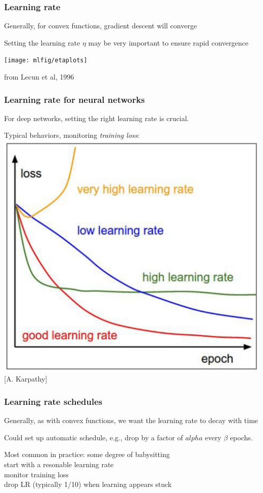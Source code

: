 \documentclass[xcolor=dvipsnames]{beamer}
\begin{document}
\begin{frame}
  \frametitle{Learning rate}
  \bi
\item Generally, for convex functions, gradient descent will converge
\item Setting the learning rate $\eta$ may be very important to ensure
  rapid convergence
  \begin{minipage}[c]{.6\linewidth}
\texttt{[image: mlfig/etaplots]}
  \end{minipage}%
  \begin{minipage}[c]{.4\linewidth}
from Lecun et al, 1996        
  \end{minipage}

\ei
\end{frame}


\begin{frame}
  \frametitle{Learning rate for neural networks}
  \bi
\item For deep networks, setting the right learning rate is crucial.
\item Typical behaviors, monitoring \emph{training loss}:
\includegraphics[width=.5\textwidth]{lrates-karpathy}[A. Karpathy]
\ei
\end{frame}

\begin{frame}
  \frametitle{Learning rate schedules}
  \bi
\item Generally, as with convex functions, we want the learning rate
  to decay with time
\item Could set up automatic schedule, e.g., drop by a factor of
  $alpha$ every $\beta$ epochs.
\item Most common in practice: some degree of babysitting\\
start with a resonable learning rate\\
monitor training loss\\
drop LR (typically 1/10) when learning appears stuck
\ei
\end{frame}
\end{document}
